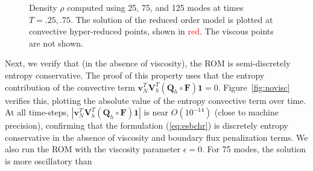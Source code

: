 \documentclass[preprint,10pt]{elsarticle}
\theoremstyle{definition}
\theoremstyle{lemma}
\theoremstyle{theorem}
\theoremstyle{assumption}
\newcommand{\LRp}[1]{\left( #1 \right)}
\newcommand{\LRb}[1]{\left| #1 \right|}
\begin{document}
\begin{figure}[!h]
\caption{Density $\rho$ computed using 25, 75, and 125 modes at times $T=.25, .75$.  The solution of the reduced order model is plotted at convective hyper-reduced points, shown in \textcolor{red}{red}.  The viscous points are not shown.}
\label{fig:romsols}
\end{figure}

Next, we verify that (in the absence of viscosity), the ROM is semi-discretely entropy conservative.  The proof of this property uses that the entropy contribution of the convective term $\bm{v}_N^T \bm{V}_h^T\LRp{\bm{Q}_h \circ \bm{F}}\bm{1} = 0$.  Figure~\ref{fig:novisc} verifies this, plotting the absolute value of the entropy convective term over time.  At all time-steps, $\LRb{\bm{v}_N^T \bm{V}_h^T\LRp{\bm{Q}_h \circ \bm{F}}\bm{1}}$ is near $O\LRp{10^{-14}}$ (close to machine precision), confirming that the formulation (\ref{eq:esbchr}) is discretely entropy conservative in the absence of viscosity and boundary flux penalization terms.  We also run the ROM with the viscosity parameter $\epsilon = 0$.  For 75 modes, the solution is more oscillatory than 
\end{document}

